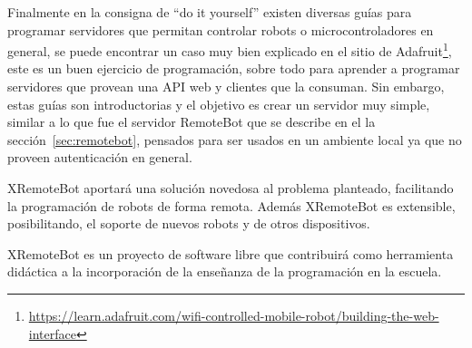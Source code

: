 Finalmente en la consigna de ``do it yourself'' existen diversas guías para
programar servidores que permitan controlar robots o microcontroladores
en general, se puede encontrar un caso muy bien explicado en el sitio
de Adafruit\footnote{\url{https://learn.adafruit.com/wifi-controlled-mobile-robot/building-the-web-interface}},
este es un buen ejercicio de programación, sobre todo para aprender a
programar servidores que provean una API web y clientes que la consuman. Sin
embargo, estas guías son introductorias y el objetivo es crear un servidor
muy simple, similar a lo que fue el servidor RemoteBot que se describe
en el la sección~\ref{sec:remotebot},
pensados para ser
usados en un ambiente local ya que no proveen autenticación en general.

XRemoteBot aportará una solución novedosa al problema planteado, facilitando
la programación de robots de forma remota. Además XRemoteBot es extensible,
posibilitando, el soporte de nuevos robots y de otros dispositivos.

XRemoteBot es un proyecto de software libre que contribuirá como herramienta
didáctica a la incorporación de la enseñanza de la programación en la
escuela.
